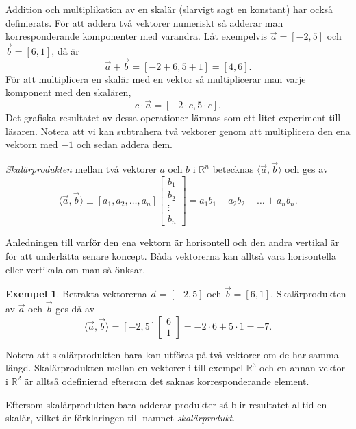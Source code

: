 \documentclass{article}
\theoremstyle{definition}
\newtheorem{exmp}[thm]{Exempel}
\begin{document}
Addition och multiplikation av en skalär (slarvigt sagt en konstant) 
har också definierats.
För att addera två vektorer numeriskt så adderar 
man korresponderande komponenter med varandra. 
Låt exempelvis $\vec{a} = [-2, 5]$ och $\vec{b} = [6, 1]$, 
då är 
\[\vec{a} + \vec{b} = [-2 + 6, 5 + 1] = [4, 6].\]
För att multiplicera en skalär
med en vektor så multiplicerar man varje komponent med den skalären,
\[c \cdot \vec{a} = [-2 \cdot c, 5 \cdot c].\]
Det grafiska resultatet av dessa operationer lämnas som ett 
litet experiment till läsaren. 
Notera att vi kan subtrahera två vektorer genom att multiplicera den ena vektorn med 
$-1$ och sedan addera dem. 
\begin{mydef}{}{}
  \textit{Skalärprodukten} mellan två vektorer $a$ och $b$ i $\mathbb{R}^n$ 
  betecknas $\langle \vec{a}, \vec{b} \rangle$ och ges av
  \[\langle \vec{a}, \vec{b} \rangle \equiv [a_1, a_2, \ldots, a_n] 
  \begin{bmatrix}
    b_1 \\
    b_2 \\
    \vdots \\
    b_n
  \end{bmatrix} = a_1 b_1 + a_2 b_2 + \ldots + a_n b_n.
  \]
\end{mydef}
Anledningen till varför den ena vektorn är horisontell och den andra vertikal är för att 
underlätta senare koncept. Båda vektorerna kan alltså vara horisontella eller vertikala 
om man så önksar. 
\begin{exmp}
  Betrakta vektorerna $\vec{a} = [-2, 5]$ och $\vec{b} = [6, 1]$. 
  Skalärprodukten av $\vec{a}$ och $\vec{b}$ ges då av
  \[\langle \vec{a}, \vec{b} \rangle = [-2, 5] 
\begin{bmatrix}
  6 \\
  1
\end{bmatrix} = -2 \cdot 6 + 5 \cdot 1 = -7.
\]  
\end{exmp}

Notera att skalärprodukten bara kan utföras på två vektorer om de har samma längd. 
Skalärprodukten mellan en vektorer i till exempel $\mathbb{R}^3$ och en annan vektor i $\mathbb{R}^2$
är alltså odefinierad eftersom det saknas korresponderande element. 

Eftersom skalärprodukten bara adderar produkter så blir resultatet alltid en skalär, vilket 
är förklaringen till namnet \textit{skalärprodukt}. 
\end{document}
